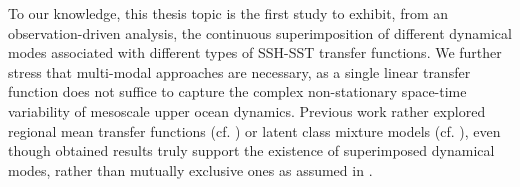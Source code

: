 \documentclass[10pt]{extarticle}
\begin{document}
To our knowledge, this thesis topic is the first study to exhibit, from an observation-driven analysis, the continuous superimposition of different dynamical modes associated with different types of SSH-SST transfer functions. We further stress that multi-modal approaches are necessary, as a single linear transfer function does not suffice to capture the complex non-stationary space-time variability of mesoscale upper ocean dynamics. Previous work rather explored regional mean transfer functions (cf. \cite{isern_fontanet,Cristina}) or latent class mixture models (cf. \cite{tandeo}), even though obtained results truly support the existence of superimposed dynamical modes, rather than mutually exclusive ones as assumed in \cite{tandeo}.
\end{document}
